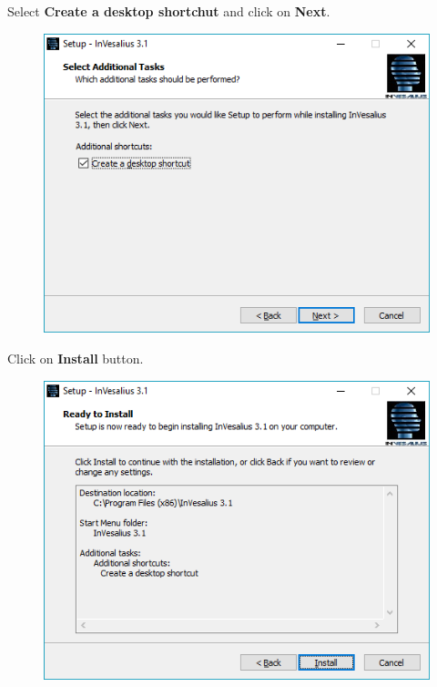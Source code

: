\hspace{.2cm}

Select \textbf{Create a desktop shortchut} and click on \textbf{Next}.

\begin{figure}[!htb]
\centering
\includegraphics[scale=0.7]{../user_guide_figures/invesalius_screen/installation_desktop_shortcut_en.png}
\end{figure}

\newpage

Click on \textbf{Install} button.

\begin{figure}[!htb]
\centering
\includegraphics[scale=0.7]{../user_guide_figures/invesalius_screen/installation_resume_en.png}
\end{figure}

